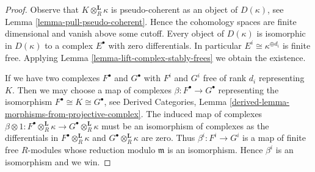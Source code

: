 \documentclass[10pt,a4paper]{amsart}
\theoremstyle{plain}
\theoremstyle{definition}
\theoremstyle{remark}
\numberwithin{equation}{subsection}
\begin{document}
\begin{proof}
Observe that $K \otimes_R^\mathbf{L} \kappa$ is pseudo-coherent
as an object of $D(\kappa)$, see Lemma \ref{lemma-pull-pseudo-coherent}.
Hence the cohomology spaces are finite dimensional and vanish above
some cutoff. Every object of $D(\kappa)$ is isomorphic
in $D(\kappa)$ to a complex $E^\bullet$ with zero differentials.
In particular $E^i \cong \kappa^{\oplus d_i}$ is finite free.
Applying Lemma \ref{lemma-lift-complex-stably-frees} we obtain
the existence.

\medskip\noindent
If we have two complexes $F^\bullet$ and $G^\bullet$
with $F^i$ and $G^i$ free of rank $d_i$ representing $K$.
Then we may choose a map of complexes $\beta : F^\bullet \to G^\bullet$
representing the isomorphism $F^\bullet \cong K \cong G^\bullet$, see
Derived Categories, Lemma
\ref{derived-lemma-morphisms-from-projective-complex}.
The induced map of complexes
$\beta \otimes 1 : F^\bullet \otimes_R^\mathbf{L} \kappa \to
G^\bullet \otimes_R^\mathbf{L} \kappa$
must be an isomorphism of complexes as the differentials
in $F^\bullet \otimes_R^\mathbf{L} \kappa$ and
$G^\bullet \otimes_R^\mathbf{L} \kappa$ are zero.
Thus $\beta^i : F^i \to G^i$ is a map of finite free $R$-modules
whose reduction modulo $\mathfrak m$ is an isomorphism.
Hence $\beta^i$ is an isomorphism and we win.
\end{proof}
\end{document}
